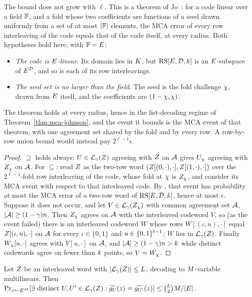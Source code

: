 The bound does not grow with $\ell$. This is a theorem of Jo~\cite[Thm.~4.4]{Jo26}: for a code linear over a field $\mathbb{F}$, and a fold whose two coefficients are functions of a seed drawn uniformly from a set of at most $|\mathbb{F}|$ elements, the MCA error of every row interleaving of the code equals that of the code itself, at every radius. Both hypotheses hold here, with $\mathbb{F} = E$:
\begin{itemize}[itemsep=1pt]
\item \emph{The code is $E$-linear.} Its domain lies in $K$, but $\mathrm{RS}[E,\mathcal{D},k]$ is an $E$-subspace of $E^{\mathcal{D}}$, and so is each of its row interleavings.
\item \emph{The seed set is no larger than the field.} The seed is the fold challenge $\chi$, drawn from $E$ itself, and the coefficients are $(1-\chi, \chi)$.
\end{itemize}
The theorem holds at every radius, hence in the list-decoding regime of Theorem~\ref{thm:mca-johnson}, and the event it bounds is the MCA event of that theorem, with one agreement set shared by the fold and by every row. A row-by-row union bound would instead pay $2^{\ell-1}\epsilon$.

\begin{proof}
$\supseteq$ holds always: $U \in \mathcal{L}_\gamma(Z)$ agreeing with $Z$ on $\mathcal{A}$ gives $U_\chi$ agreeing with $Z_\chi$ on $\mathcal{A}$. For $\subseteq$: read $Z$ as the two-row word $(Z[(0,\cdot),\cdot], Z[(1,\cdot),\cdot])$ over the $2^{\ell-1}$-fold row interleaving of the code, whose fold at $\chi$ is $Z_\chi$, and consider its MCA event with respect to that interleaved code. By \cite[Thm.~4.4]{Jo26}, that event has probability at most the MCA error of a two-row word of $\mathrm{RS}[E,\mathcal{D},k]$, hence at most $\epsilon$. Suppose it does not occur, and let $V \in \mathcal{L}_\gamma(Z_\chi)$ with common agreement set $\mathcal{A}$, $|\mathcal{A}| \ge (1-\gamma)n$. Then $Z_\chi$ agrees on $\mathcal{A}$ with the interleaved codeword $V$, so (as the event failed) there is an interleaved codeword $W$ whose rows $W[(\iota,u),\cdot]$ equal $Z[(\iota,u),\cdot]$ on $\mathcal{A}$ for every $\iota \in \{0,1\}$ and $u \in \{0,1\}^{\ell-1}$; $W$ lies in $\mathcal{L}_\gamma(Z)$. Finally $W_\chi[u,\cdot]$ agrees with $V[u,\cdot]$ on $\mathcal{A}$, and $|\mathcal{A}| \ge (1-\gamma)n > k$ while distinct codewords agree on fewer than $k$ points, so $V = W_\chi$.
\end{proof}

\begin{lemma}\label{lem:ood}
Let $Z$ be an interleaved word with $|\mathcal{L}_\gamma(Z)| \le L$, decoding to $M$-variable multilinears. Then $\Pr_{z \leftarrow E^{M}}[\exists \text{ distinct } U, U' \in \mathcal{L}_\gamma(Z) : \widetilde{g_U}(z) = \widetilde{g_{U'}}(z)] \le \binom{L}{2} M / |E|$.
\end{lemma}


